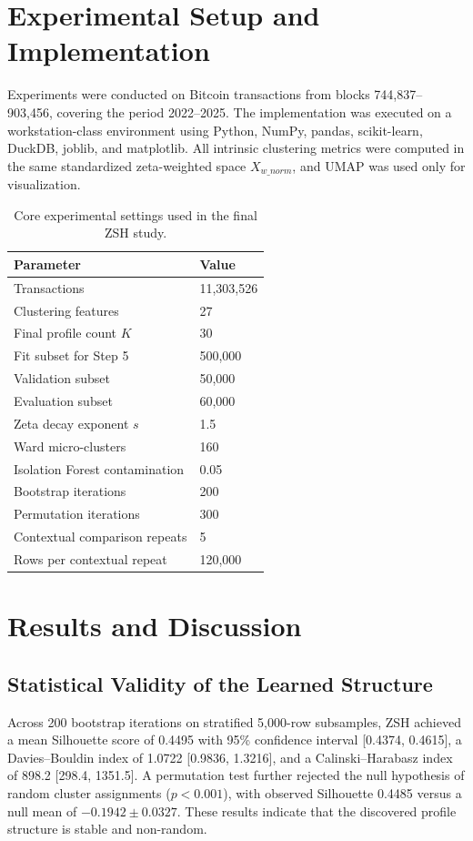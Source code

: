 \documentclass{ieeeaccess}
\begin{document}
\section{Experimental Setup and Implementation}

Experiments were conducted on Bitcoin transactions from blocks 744,837--903,456, covering the period 2022--2025. The implementation was executed on a workstation-class environment using Python, NumPy, pandas, scikit-learn, DuckDB, joblib, and matplotlib. All intrinsic clustering metrics were computed in the same standardized zeta-weighted space $X_{w\_norm}$, and UMAP was used only for visualization.

\begin{table}[!t]
\caption{Core experimental settings used in the final ZSH study.}
\label{tab:settings}
\centering
\begin{tabular}{ll}
\toprule
Parameter & Value \\
\midrule
Transactions & 11,303,526 \\
Clustering features & 27 \\
Final profile count $K$ & 30 \\
Fit subset for Step 5 & 500,000 \\
Validation subset & 50,000 \\
Evaluation subset & 60,000 \\
Zeta decay exponent $s$ & 1.5 \\
Ward micro-clusters & 160 \\
Isolation Forest contamination & 0.05 \\
Bootstrap iterations & 200 \\
Permutation iterations & 300 \\
Contextual comparison repeats & 5 \\
Rows per contextual repeat & 120,000 \\
\bottomrule
\end{tabular}
\end{table}

\section{Results and Discussion}

\subsection{Statistical Validity of the Learned Structure}

Across 200 bootstrap iterations on stratified 5,000-row subsamples, ZSH achieved a mean Silhouette score of 0.4495 with 95\% confidence interval [0.4374, 0.4615], a Davies--Bouldin index of 1.0722 [0.9836, 1.3216], and a Calinski--Harabasz index of 898.2 [298.4, 1351.5]. A permutation test further rejected the null hypothesis of random cluster assignments ($p < 0.001$), with observed Silhouette 0.4485 versus a null mean of $-0.1942 \pm 0.0327$. These results indicate that the discovered profile structure is stable and non-random.
\end{document}
